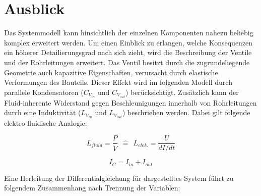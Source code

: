 \documentclass[fontsize=12pt, a4paper]{scrartcl}
\let\stdsection\section 	%
\renewcommand\section{\newpage\stdsection}
\begin{document}
\section{Ausblick}

Das Systemmodell kann hinsichtlich der einzelnen Komponenten nahezu beliebig komplex erweitert werden. Um einen Einblick zu erlangen, welche Konsequenzen ein höherer Detailierungsgrad nach sich zieht, wird die Beschreibung der Ventile und der Rohrleitungen erweitert. Das Ventil besitzt durch die zugrundeliegende Geometrie auch kapazitive Eigenschaften, verursacht durch elastische Verformungen des Bauteils. Dieser Effekt wird im folgenden Modell durch parallele Kondensatoren ($C_V_{in}$ und $C_V_{out}$) berücksichtigt. Zusätzlich kann der Fluid-inherente Widerstand gegen Beschleunigungen innerhalb von Rohrleitungen durch eine Induktivität ($L_V_{in}$ und $L_V_{out}$) beschrieben werden. Dabei gilt folgende elektro-fluidische Analogie:


\begin{equation}
	L_{fluid} = \frac{P}{\ddot{V}} \:\:\widehat{=}\:\: L_{elek.} = \frac{U}{dI/dt}
\end{equation}

\begin{equation}
	I_{C} = I_{in} + I_{out}
\end{equation}

\begin{center}
	
\end{center}

Eine Herleitung der Differentialgleichung für dargestelltes System führt zu folgendem Zusammenhang nach Trennung der Variablen:
\end{document}
